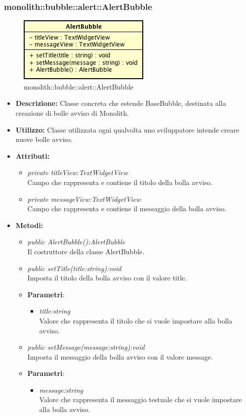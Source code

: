 \subsubsection{monolith::bubble::alert::AlertBubble}

\label{monolith::bubble::alert::AlertBubble}
\begin{figure}[ht]
	\centering
	\includegraphics[scale=0.5]{Sezioni/SottosezioniST/img/AlertBubble.png}
	\caption{monolith::bubble::alert::AlertBubble}
\end{figure}

\begin{itemize}
\item \textbf{Descrizione:} Classe concreta che estende BaseBubble, destinata alla creazione di bolle avviso di Monolith.
\item \textbf{Utilizzo:} Classe utilizzata ogni qualvolta uno sviluppatore intende creare nuove bolle avviso.
\item \textbf{Attributi:} 
\begin{itemize}
\item \textit{private titleView:TextWidgetView}\\
Campo che rappresenta e contiene il titolo della bolla avviso.
\item \textit{private messageView:TextWidgetView}\\
Campo che rappresenta e contiene il messaggio della bolla avviso.
\end{itemize}
\item \textbf{Metodi:}
\begin{itemize}
\item \textit{public AlertBubble():AlertBubble}\\
Il costruttore della classe AlertBubble.
\item \textit{public setTitle(title:string):void}\\
Imposta il titolo della bolla avviso con il valore title.
\item{\textbf{Parametri}: \begin{itemize}
\item \textit{title:string}\\
Valore che rappresenta il titolo che si vuole impostare alla bolla avviso.
\end{itemize}}
\item \textit{public setMessage(message:string):void}\\
Imposta il messaggio della bolla avviso con il valore message.
\item{\textbf{Parametri}: \begin{itemize}
\item \textit{message:string}\\
Valore che rappresenta il messaggio testuale che si vuole impostare alla bolla avviso.
\end{itemize}}
\end{itemize}
\end{itemize}